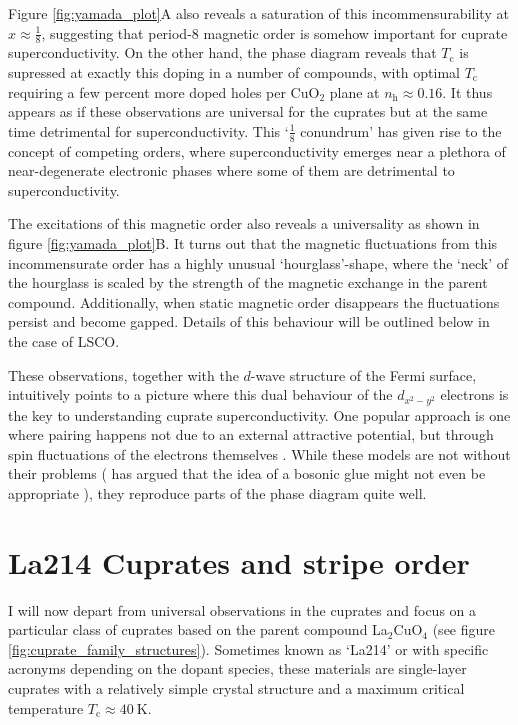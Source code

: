 Figure \ref{fig:yamada_plot}A also reveals a saturation of this incommensurability at $x \approx \frac{1}{8}$, suggesting that period-8 magnetic order is somehow important for cuprate superconductivity. On the other hand, the phase diagram reveals that $T_\text{c}$ is supressed at exactly this doping in a number of compounds, with optimal $T_\text{c}$ requiring a few percent more doped holes per CuO$_2$ plane at $n_\text{h} \approx 0.16$. It thus appears as if these observations are universal for the cuprates but at the same time detrimental for superconductivity. This `$\frac{1}{8}$ conundrum' has given rise to the concept of competing orders, where superconductivity emerges near a plethora of near-degenerate electronic phases where some of them are detrimental to superconductivity.

The excitations of this magnetic order also reveals a universality as shown in figure \ref{fig:yamada_plot}B. It turns out that the magnetic fluctuations from this incommensurate order has a highly unusual `hourglass'-shape, where the `neck' of the hourglass is scaled by the strength of the magnetic exchange in the parent compound. Additionally, when static magnetic order disappears the fluctuations persist and become gapped. Details of this behaviour will be outlined below in the case of LSCO.

These observations, together with the $d$-wave structure of the Fermi surface, intuitively points to a picture where this dual behaviour of the $d_{x^2-y^2}$ electrons is the key to understanding cuprate superconductivity. One popular approach is one where pairing happens not due to an external attractive potential, but through spin fluctuations of the electrons themselves \cite{Scalapino2012}. While these models are not without their problems (\citeauthor{Anderson2007} has argued that the idea of a bosonic glue might not even be appropriate \cite{Anderson2007}), they reproduce parts of the phase diagram quite well.

\section{La214 Cuprates and stripe order}\label{sec:lsco}
I will now depart from universal observations in the cuprates and focus on a particular class of cuprates based on the parent compound La$_2$CuO$_4$ (see figure \ref{fig:cuprate_family_structures}). Sometimes known as `La214' or with specific acronyms depending on the dopant species, these materials are single-layer cuprates with a relatively simple crystal structure and a maximum critical temperature $T_\text{c} \approx \SI{40}{\kelvin}$.

